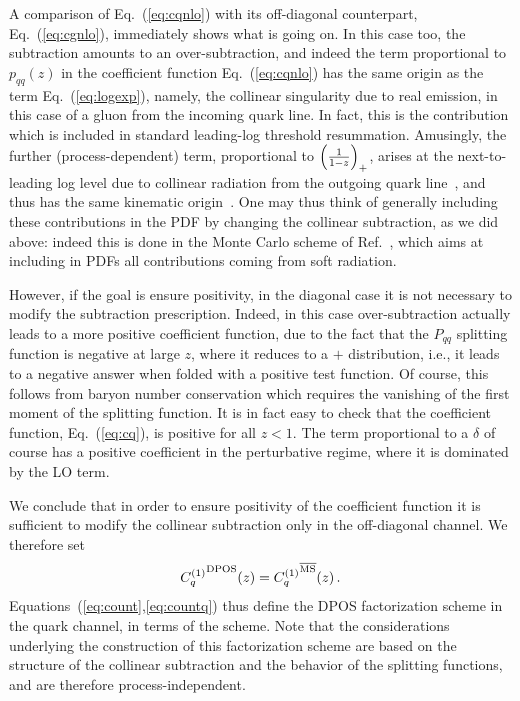 A comparison of Eq.~(\ref{eq:cqnlo}) with its off-diagonal counterpart,
Eq.~(\ref{eq:cgnlo}), immediately shows what is going on. In this
case too, the \msbar{} subtraction amounts to an over-subtraction, and
indeed the term proportional to $p_{qq}(z)$ in the coefficient
function Eq.~(\ref{eq:cqnlo}) has the same origin as the term
Eq.~(\ref{eq:logexp}), namely, the collinear singularity due to real
emission, in this case of a gluon from the incoming quark line. In
fact,  this is the contribution which is included in standard
leading-log threshold resummation. Amusingly, the further
(process-dependent)
term, proportional
to ${ \left( \frac{1}{1-z} \right)_+ }$, arises at the next-to-leading log level due to collinear
radiation from the outgoing quark line~\cite{Catani:1989ne}, and thus has
the same kinematic origin~\cite{Forte:2002ni}.
One may thus think of generally including these contributions in the
PDF by changing the collinear subtraction, as we did above: indeed
this is done in the Monte Carlo scheme of
Ref.~\cite{Jadach:2016acv}, which aims at including in PDFs
all contributions coming from soft radiation.


However, if the goal is ensure positivity, in the diagonal case
it is not necessary to
modify the \msbar{}  subtraction prescription. Indeed,
in this case over-subtraction actually leads to a more positive
coefficient function, due to the fact that the $P_{qq}$ splitting
function  is negative at large $z$, where it reduces to a $+$
distribution,
i.e., it leads to a negative answer
when folded with a positive test function. Of course, this follows from
baryon number conservation which requires the vanishing of the first
moment of the splitting function. It is in fact easy to check that the
\msbar{} coefficient function, Eq.~(\ref{eq:cq}), is positive for all
$z<1$. The  term proportional to a $\delta$ of course has a positive
coefficient in the perturbative regime, where it is dominated by the
LO term.

We conclude that in order to ensure positivity of the coefficient
function it is sufficient to modify the collinear subtraction only in the
off-diagonal channel. We therefore set
\begin{align}\label{eq:countq}
   {C_{q}^{(1)}}^{\textrm{DPOS}}(z)=  {C_{q}^{(1)}}^{{\overline{\textrm{{MS}}}}}(z) \,.
\end{align}
Equations~(\ref{eq:count},\ref{eq:countq}) thus define the DPOS
factorization scheme in the quark channel, in terms of the \msbar{} scheme.
Note that the considerations underlying the construction of this
factorization scheme are based on the
structure of the collinear subtraction and the behavior of the
splitting functions, and are therefore process-independent.

